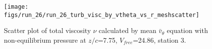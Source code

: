 \begin{figure}[H]
\centering
\texttt{[image: figs/run\_26/run\_26\_turb\_visc\_by\_vtheta\_vs\_r\_meshscatter]}
\caption{Scatter plot of total viscosity $\nu$ calculated by mean $\bar{v}_{\theta}$ equation with non-equilibrium pressure at $z/c$=7.75, $V_{free}$=24.86, station 3.}
\label{fig:run_26_turb_visc_by_vtheta_vs_r_meshscatter}
\end{figure}


